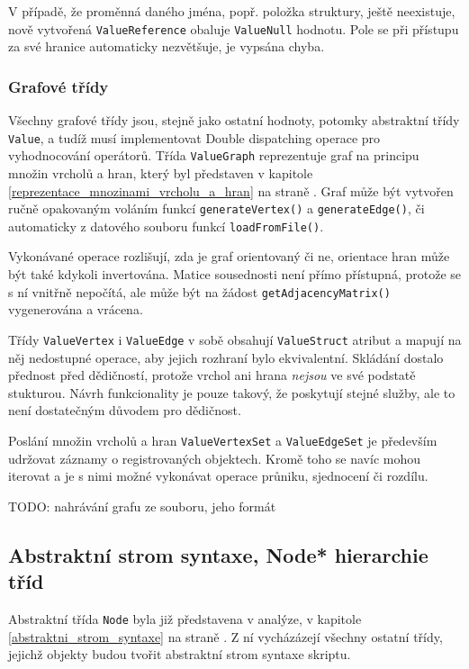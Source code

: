 \documentclass[11pt,twoside,a4paper]{book}
\begin{document}
V případě, že proměnná daného jména, popř. položka struktury, ještě neexistuje, nově vytvořená \texttt{ValueReference} obaluje \texttt{ValueNull} hodnotu. Pole se při přístupu za své hranice automaticky nezvětšuje, je vypsána chyba.


\subsubsection{Grafové třídy}

Všechny grafové třídy jsou, stejně jako ostatní hodnoty, potomky abstraktní třídy \texttt{Value}, a tudíž musí implementovat Double dispatching operace pro vyhodnocování operátorů. Třída \texttt{ValueGraph} reprezentuje graf na principu množin vrcholů a hran, který byl představen v kapitole \ref{reprezentace_mnozinami_vrcholu_a_hran} na straně \pageref{reprezentace_mnozinami_vrcholu_a_hran}. Graf může být vytvořen ručně opakovaným voláním funkcí \texttt{generateVertex()} a \texttt{generateEdge()}, či automaticky z datového souboru funkcí \texttt{lo\-ad\-From\-Fi\-le()}.

Vykonávané operace rozlišují, zda je graf orientovaný či ne, orientace hran může být také kdykoli invertována. Matice sousednosti není přímo přístupná, protože se s ní vnitřně nepočítá, ale může být na žádost \texttt{getAdjacencyMatrix()} vygenerována a vrácena.

Třídy \texttt{ValueVertex} i \texttt{ValueEdge} v sobě obsahují \texttt{ValueStruct} atribut a mapují na něj nedostupné operace, aby jejich rozhraní bylo ekvivalentní. Skládání dostalo přednost před dědičností, protože vrchol ani hrana \textit{nejsou} ve své podstatě stukturou. Návrh funkcionality je pouze takový, že poskytují stejné služby, ale to není dostatečným důvodem pro dědičnost.

Poslání množin vrcholů a hran \texttt{ValueVertexSet} a \texttt{ValueEdgeSet} je především udržovat záznamy o registrovaných objektech. Kromě toho se navíc mohou iterovat a je s nimi možné vykonávat operace průniku, sjednocení či rozdílu.

TODO: nahrávání grafu ze souboru, jeho formát


\subsection{Abstraktní strom syntaxe, Node* hierarchie tříd}

Abstraktní třída \texttt{Node} byla již představena v analýze, v kapitole \ref{abstraktni_strom_syntaxe} na straně \pageref{abstraktni_strom_syntaxe}. Z ní vycházázejí všechny ostatní třídy, jejichž objekty budou tvořit abstraktní strom syntaxe skriptu.
\end{document}
